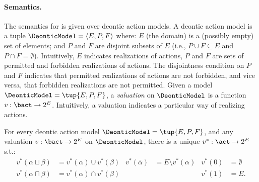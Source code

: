 \paragraph{Semantics.}\label{section:dal:semantics}

The semantics for \DAL is given over deontic action models.
A deontic action model is a tuple $\DeonticModel = \langle E, P, F \rangle$ where: $E$ (the domain) is a (possibly empty) set of elements; and $P$ and $F$ are disjoint subsets of $E$ (i.e., ${P \cup F} \subseteq E$ and ${P \cap F} = \emptyset$).
Intuitively, $E$ indicates realizations of actions, $P$ and $F$ are sets of permitted and forbidden realizations of actions.
The disjointness condition on $P$ and $F$ indicates that permitted realizations of actions are not forbidden, and vice versa, that forbidden realizations are not permitted.
Given a model $\DeonticModel = \tup{E,P,F}$, a \emph{valuation} on $\DeonticModel$ is a function $v: \bact \rightarrow 2^E$.
Intuitively, a valuation indicates a particular way of realizing actions.

\medskip
\begin{proposition}
   For every deontic action model $\DeonticModel = \tup{E,P,F}$, and any valuation $v: {\bact \to 2^E}$ on $\DeonticModel$, there is a unique $v^{*} : {\act \rightarrow 2^E}$ s.t.:
   \begin{align*}
            v^{*}(\alpha \sqcup \beta)
               &=
               {v^{*}(\alpha)
               \cup
               v^{*}(\beta)}
         &
         v^{*}(\bar{\alpha})
               &=
               {E \setminus v^{*}(\alpha)}
         &
         v^{*}(0)
               &=  \emptyset
         \\
            v^{*}(\alpha \sqcap \beta)
               &=
               {v^{*}(\alpha)
               \cap
               v^{*}(\beta)}
         &&&
            v^{*}(1)
               &=  E.
   \end{align*}%
\end{proposition}
\medskip




